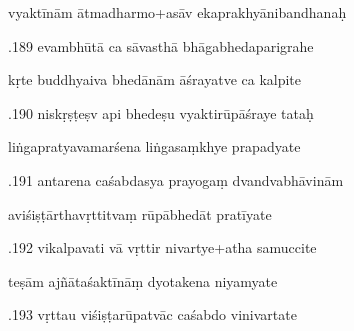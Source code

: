 \documentclass[article,12pt,a4paper]{memoir}%
\newcounter{parCount}
\begin{document}
	  
	  \pstart \leavevmode%
	vyaktīnām ātmadharmo+asāv ekaprakhyānibandhanaḥ 
	{}
	\pend%
      

	  
	  \pstart {}.189 evambhūtā ca sāvasthā bhāgabhedaparigrahe 
	{}
	\pend%
      

	  
	  \pstart \leavevmode%
	kṛte buddhyaiva bhedānām āśrayatve ca kalpite 
	{}
	\pend%
      

	  
	  \pstart {}.190 niskṛṣṭeṣv api bhedeṣu vyaktirūpāśraye tataḥ 
	{}
	\pend%
      

	  
	  \pstart \leavevmode%
	liṅgapratyavamarśena liṅgasaṃkhye prapadyate 
	{}
	\pend%
      

	  
	  \pstart {}.191 antarena caśabdasya prayogaṃ dvandvabhāvinām 
	{}
	\pend%
      

	  
	  \pstart \leavevmode%
	aviśiṣṭārthavṛttitvaṃ rūpābhedāt pratīyate 
	{}
	\pend%
      

	  
	  \pstart {}.192 vikalpavati vā vṛttir nivartye+atha samuccite 
	{}
	\pend%
      

	  
	  \pstart \leavevmode%
	teṣām ajñātaśaktīnāṃ dyotakena niyamyate 
	{}
	\pend%
      

	  
	  \pstart {}.193 vṛttau viśiṣṭarūpatvāc caśabdo vinivartate 
	{}
	\pend%
      
\end{document}
